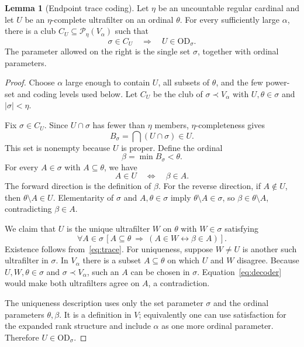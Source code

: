 \documentclass[11pt,letterpaper]{article}
\theoremstyle{definition}
\newtheorem{lemma}[definition]{Lemma}
\newcommand{\OD}{\mathrm{OD}}
\newcommand{\Pow}{\mathcal P}
\begin{document}
\begin{lemma}[Endpoint trace coding]\label{lem:trace}
Let $\eta$ be an uncountable regular cardinal and let $U$ be an
$\eta$-complete ultrafilter on an ordinal $\theta$. For every sufficiently
large $\alpha$, there is a club $C_U\subseteq\Pow_\eta(V_\alpha)$ such that
\[
 \sigma\in C_U\quad\Longrightarrow\quad U\in\OD_\sigma.
\]
The parameter allowed on the right is the single set $\sigma$, together with
ordinal parameters.
\end{lemma}

\begin{proof}
Choose $\alpha$ large enough to contain $U$, all subsets of $\theta$, and the
few power-set and coding levels used below. Let $C_U$ be the club of
$\sigma\prec V_\alpha$ with $U,\theta\in\sigma$ and $|\sigma|<\eta$.

Fix $\sigma\in C_U$. Since $U\cap\sigma$ has fewer than $\eta$ members,
$\eta$-completeness gives
\[
 B_\sigma=\bigcap(U\cap\sigma)\in U.
\]
This set is nonempty because $U$ is proper. Define the ordinal
\[
 \beta=\min B_\sigma<\theta.
\]
For every $A\in\sigma$ with $A\subseteq\theta$, we have
\begin{equation}\label{eq:trace}
 A\in U\quad\Longleftrightarrow\quad\beta\in A.
\end{equation}
The forward direction is the definition of $\beta$. For the reverse direction,
if $A\notin U$, then $\theta\setminus A\in U$. Elementarity of $\sigma$ and
$A,\theta\in\sigma$ imply $\theta\setminus A\in\sigma$, so
$\beta\in\theta\setminus A$, contradicting $\beta\in A$.

We claim that $U$ is the unique ultrafilter $W$ on $\theta$ with $W\in\sigma$
satisfying
\begin{equation}\label{eq:decoder}
 \forall A\in\sigma\,
 [A\subseteq\theta\ \Longrightarrow\ (A\in W\leftrightarrow\beta\in A)].
\end{equation}
Existence follows from~\eqref{eq:trace}. For uniqueness, suppose $W\neq U$ is
another such ultrafilter in $\sigma$. In $V_\alpha$ there is a subset
$A\subseteq\theta$ on which $U$ and $W$ disagree. Because $U,W,\theta\in\sigma$
and $\sigma\prec V_\alpha$, such an $A$ can be chosen in $\sigma$.
Equation~\eqref{eq:decoder} would make both ultrafilters agree on $A$, a contradiction.

The uniqueness description uses only the set parameter $\sigma$ and the
ordinal parameters $\theta,\beta$. It is a definition in $V$; equivalently one
can use satisfaction for the expanded rank structure and include $\alpha$
as one more ordinal parameter. Therefore $U\in\OD_\sigma$.
\end{proof}
\end{document}

